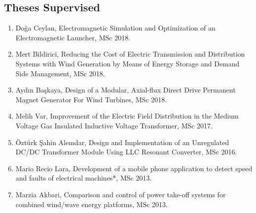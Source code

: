 \documentclass[a4paper,12pt]{article}
\begin{document}
\begin{publications}

\section{Theses Supervised}


\begin{enumerate}

\item Doğa Ceylan, Electromagnetic Simulation and Optimization of an Electromagnetic Launcher, MSc 2018.
\item Mert Bildirici, Reducing the Cost of Electric Transmission and Distribution Systems with Wind Generation by Means of Energy Storage and Demand Side Management, MSc 2018.
\item Aydın Başkaya, Design of a Modular, Axial-flux Direct Drive Permanent
Magnet Generator For Wind Turbines, MSc 2018.
\item Melih Var, Improvement of the Electric Field Distribution in the Medium Voltage Gas Insulated Inductive Voltage Transformer, MSc 2017.
\item Öztürk Şahin Alemdar, Design and Implementation of an Unregulated DC/DC Transformer Module Using LLC Resonant Converter, MSc 2016. 
\item Mario Recio Lara, Development of a mobile phone application to detect speed and faults of electrical machines*, MSc 2013.
\item Marzia Akbari, Comparison and control of power take-off systems for combined wind/wave energy platforms, MSc 2013.

\end{enumerate}

\end{publications}


\end{document}
